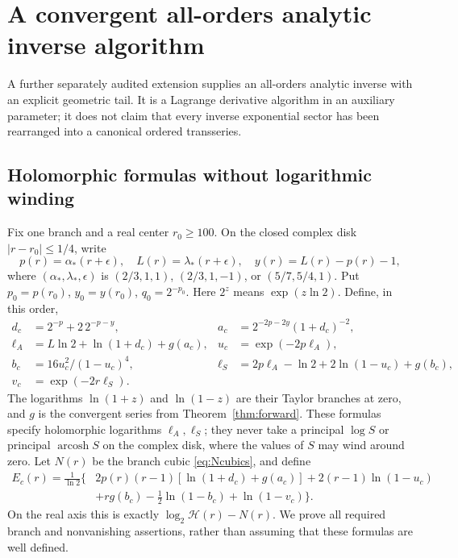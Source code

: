 \section{A convergent all-orders analytic inverse algorithm}
\label{sec:allinverse}
A further separately audited extension \cite{allinverse,allaudit}
supplies an all-orders analytic inverse with an explicit geometric
tail. It is a Lagrange derivative algorithm in an auxiliary parameter;
it does not claim that every inverse exponential sector has been
rearranged into a canonical ordered transseries.

\subsection{Holomorphic formulas without logarithmic winding}
Fix one branch and a real center $r_0\ge100$. On the closed complex
disk $|r-r_0|\le1/4$, write
\[
 p(r)=\alpha_*(r+\epsilon),\quad L(r)=\lambda_*(r+\epsilon),\quad
 y(r)=L(r)-p(r)-1,
\]
where $(\alpha_*,\lambda_*,\epsilon)$ is
$(2/3,1,1)$, $(2/3,1,-1)$, or $(5/7,5/4,1)$.
Put $p_0=p(r_0)$, $y_0=y(r_0)$, $q_0=2^{-p_0}$.
Here $2^z$ means $\exp(z\ln2)$. Define, in this order,
\begin{align*}
 d_c&=2^{-p}+2\,2^{-p-y},&
 a_c&=2^{-2p-2y}(1+d_c)^{-2},\\
 \ell_A&=L\ln2+\ln(1+d_c)+g(a_c),&
 u_c&=\exp(-2p\ell_A),\\
 b_c&=16u_c^2/(1-u_c)^4,&
 \ell_S&=2p\ell_A-\ln2+2\ln(1-u_c)+g(b_c),\\
 v_c&=\exp(-2r\ell_S).&&
\end{align*}
The logarithms $\ln(1+z)$ and $\ln(1-z)$ are their Taylor branches
at zero, and $g$ is the convergent series from
Theorem~\ref{thm:forward}. These formulas specify holomorphic
logarithms $\ell_A,\ell_S$; they never take a principal
$\log S$ or principal $\operatorname{arcosh}S$ on the complex disk,
where the values of $S$ may wind around zero.
Let $N(r)$ be the branch cubic \eqref{eq:Ncubics}, and define
\begin{align}
 E_c(r)=\frac1{\ln2}\bigl\{&2p(r)(r-1)[\ln(1+d_c)+g(a_c)]
 +2(r-1)\ln(1-u_c)\nonumber\\
 &+r g(b_c)-\tfrac12\ln(1-b_c)+\ln(1-v_c)\bigr\}.
 \label{eq:complexE}
\end{align}
On the real axis this is exactly $\log_2\mathcal H(r)-N(r)$.
We prove all required branch and nonvanishing assertions, rather than
assuming that these formulas are well defined.

